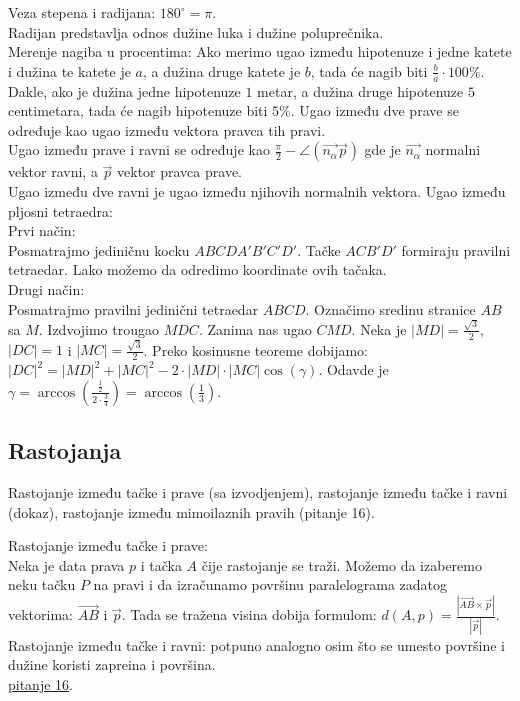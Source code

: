 \documentclass[12pt]{article}
\newcommand{\vek}[1]{\overrightarrow{#1}}
\begin{document}
    \vspace*{1cm}

    Veza stepena i radijana: $180^\circ=\pi$.\\
    Radijan predstavlja odnos dužine luka i dužine poluprečnika.\\
    Merenje nagiba u procentima: Ako merimo ugao između hipotenuze
    i jedne katete i dužina te katete je $a$, a dužina druge
    katete je $b$, tada će nagib biti $\frac{b}{a}\cdot 100\%$. Dakle,
    ako je dužina jedne hipotenuze $1$ metar, a dužina druge
    hipotenuze $5$ centimetara, tada će nagib hipotenuze biti $5\%$.
    Ugao između dve prave se određuje kao ugao između vektora pravca
    tih pravi.\\
    Ugao između prave i ravni se određuje kao $\frac{\pi}{2}-\angle(\vek{n_\alpha}\vek{p})$
    gde je $\vek{n_\alpha}$ normalni vektor ravni, a $\vek{p}$ vektor pravca prave.\\
    Ugao između dve ravni je ugao između njihovih normalnih vektora.
    Ugao između pljosni tetraedra:\\
    Prvi način:\\
    Posmatrajmo jediničnu kocku $ABCDA'B'C'D'$.
    Tačke $ACB'D'$ formiraju pravilni tetraedar. Lako možemo
    da odredimo koordinate ovih tačaka.\\
    Drugi način:\\
    Posmatrajmo pravilni jedinični tetraedar $ABCD$. Označimo sredinu
    stranice $AB$ sa $M$. Izdvojimo trougao $MDC$. Zanima nas
    ugao $CMD$. Neka je $|MD|=\frac{\sqrt{3}}{2}$, $|DC|=1$ i $|MC|=\frac{\sqrt{3}}{2}$.
    Preko kosinusne teoreme dobijamo:\\
$|DC|^2=|MD|^2+|MC|^2-2\cdot|MD|\cdot|MC|\cos(\gamma)$.
    Odavde je $\gamma=\arccos(\frac{\frac{1}{2}}{2\cdot\frac{3}{4}})=\arccos(\frac{1}{3})$.

    \subsection{Rastojanja}
    Rastojanje između tačke i prave (sa izvodjenjem),
    rastojanje između tačke i ravni (dokaz), rastojanje između
    mimoilaznih pravih (pitanje 16).\par

    \vspace*{1cm}

    Rastojanje između tačke i prave:\\
    Neka je data prava $p$ i tačka $A$ čije rastojanje se traži.
    Možemo da izaberemo neku tačku $P$ na pravi i da izračunamo
    površinu paralelograma zadatog vektorima: $\vek{AB}$ i $\vek{p}$.
    Tada se tražena visina dobija formulom: $d(A,p)=\frac{|\vek{AB}\times\vek{p}|}{|\vek{p}|}$.\\
Rastojanje između tačke i ravni: potpuno analogno osim što
se umesto površine i dužine koristi zapreina i površina.\\
\hyperlink{subsec:pitanje_16}{pitanje 16}.
\end{document}

